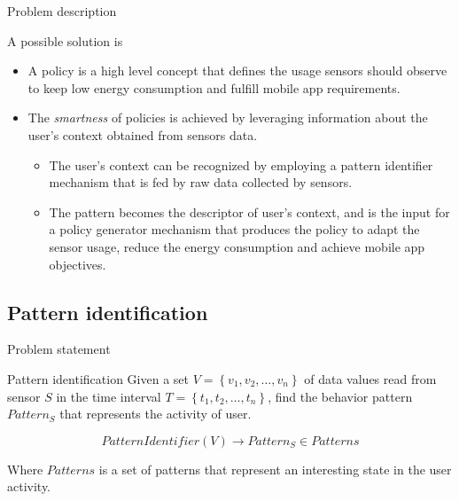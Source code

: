 \begin{frame}{Problem description}
  \begin{block}{A possible solution is}
    \begin{itemize}
      \item A policy is a high level concept that defines the usage sensors should observe to keep low energy consumption and fulfill mobile app requirements.

      \item The \emph{smartness} of policies is achieved by leveraging information about the user’s context obtained from sensors data.
      \begin{itemize}
        \item The user’s context can be recognized by employing a pattern identifier mechanism that is fed by raw data collected by sensors.

        \item The pattern becomes the descriptor of user’s context, and is the input for a policy generator mechanism that produces the policy to adapt the sensor usage, reduce the energy consumption and achieve mobile app objectives.
      \end{itemize}
      
    \end{itemize}
  \end{block}
\end{frame}


\subsection{Pattern identification}

\begin{frame}{Problem statement}
  \begin{exampleblock}{Pattern identification}
    Given a set $V = \left\{v_{1}, v_{2}, \dotsc, v_{n}\right\}$ of data values read from sensor $S$ in the time interval $T = \left\{t_{1}, t_{2}, \dotsc, t_{n}\right\}$, find the behavior pattern $Pattern_{S}$ that represents the activity of user.

    \begin{equation}
      PatternIdentifier( V ) \longrightarrow{} Pattern_{S} \in Patterns
    \end{equation}

    Where $Patterns$ is a set of patterns that represent an interesting state in the user activity.
  \end{exampleblock}
\end{frame}



